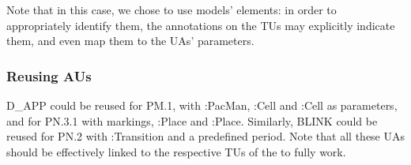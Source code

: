 Note that in this case, we chose to use models' elements: in order to appropriately
identify them, the annotations on the TUs may explicitly indicate them, and even
map them to the UAs' parameters. 

\subsubsection{Reusing AUs}
\label{sec:Proposal-Reuse}

\textsf{D\_APP} could be reused for \textsf{PM.1}, with \textsf{:PacMan},
\textsf{:Cell} and \textsf{:Cell} as parameters, and for \textsf{PN.3.1}
with \textsf{markings}, \textsf{:Place} and \textsf{:Place}. Similarly,
\textsf{BLINK} could be reused for \textsf{PN.2} with \textsf{:Transition}
and a predefined \textsf{period}. Note that all these UAs should be
effectively linked to the respective TUs of the \DSLs to fully work.
